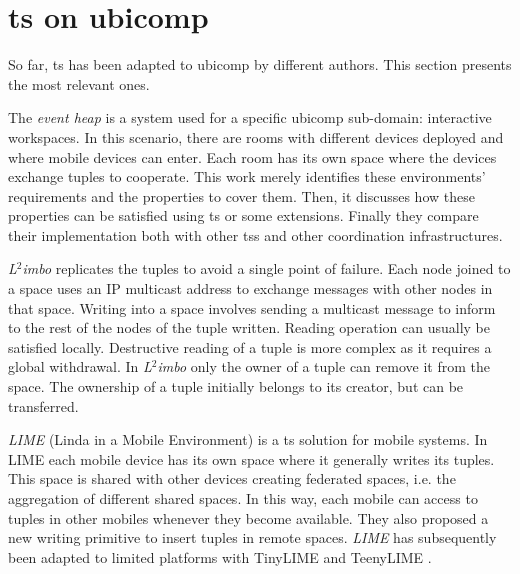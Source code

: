 \section{\acl{ts} on \acs{ubicomp}}
\label{sec:soa_ts_ubicomp}

So far, \acl{ts} has been adapted to \acl{ubicomp} by different authors.
This section presents the most relevant ones. %




The \emph{event heap} \citep{johanson_extending_2004} is a system used for a specific \ac{ubicomp} sub-domain: interactive workspaces.
In this scenario, there are rooms with different devices deployed and where mobile devices can enter.
Each room has its own space where the devices exchange tuples to cooperate.
This work merely identifies these environments' requirements and the properties to cover them. %
Then, it discusses how these properties can be satisfied using \ac{ts} or some extensions.
Finally they compare their implementation both with other \acp{ts} and other coordination infrastructures. %


\emph{L$^2$imbo} \citep{davies_l2imbo:_1998,friday_experiences_1999} replicates the tuples to avoid a single point of failure.
Each node joined to a space uses an IP multicast address to exchange messages with other nodes in that space.
Writing into a space involves sending a multicast message to inform to the rest of the nodes of the tuple written.
Reading operation can usually be satisfied locally.
Destructive reading of a tuple is more complex as it requires a global withdrawal.
In \emph{L$^2$imbo} only the owner of a tuple can remove it from the space.
The ownership of a tuple initially belongs to its creator, but can be transferred. %


\emph{LIME} (Linda in a Mobile Environment) \citep{picco_lime:_1999} is a \ac{ts} solution for mobile systems.
In LIME each mobile device has its own space where it generally writes its tuples.
This space is shared with other devices creating federated spaces, i.e. the aggregation of different shared spaces.
In this way, each mobile can access to tuples in other mobiles whenever they become available.
They also proposed a new writing primitive to insert tuples in remote spaces.
\emph{LIME} has subsequently been adapted to limited platforms \citep{murphy_transiently_2006} with TinyLIME \citep{curino_tinylime:_2005} and TeenyLIME \citep{costa_programming_2007}.

